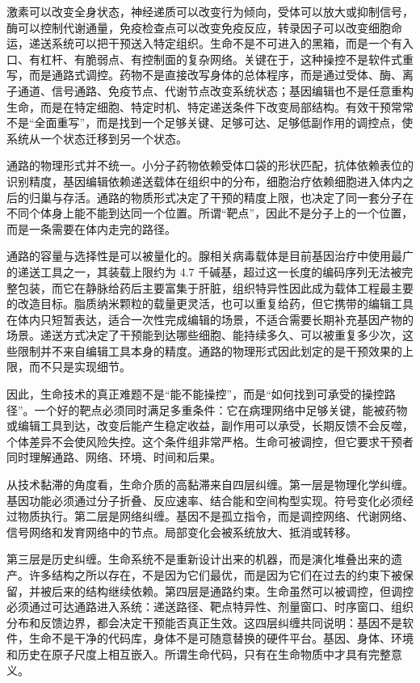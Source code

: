 
激素可以改变全身状态，神经递质可以改变行为倾向，受体可以放大或抑制信号，酶可以控制代谢通量，免疫检查点可以改变免疫反应，转录因子可以改变细胞命运，递送系统可以把干预送入特定组织。生命不是不可进入的黑箱，而是一个有入口、有杠杆、有脆弱点、有控制面的复杂网络。关键在于，这种操控不是软件式重写，而是通路式调控。药物不是直接改写身体的总体程序，而是通过受体、酶、离子通道、信号通路、免疫节点、代谢节点改变系统状态；基因编辑也不是任意重构生命，而是在特定细胞、特定时机、特定递送条件下改变局部结构。有效干预常常不是“全面重写”，而是找到一个足够关键、足够可达、足够低副作用的调控点，使系统从一个状态迁移到另一个状态。

通路的物理形式并不统一。小分子药物依赖受体口袋的形状匹配，抗体依赖表位的识别精度，基因编辑依赖递送载体在组织中的分布，细胞治疗依赖细胞进入体内之后的归巢与存活。通路的物质形式决定了干预的精度上限，也决定了同一套分子在不同个体身上能不能到达同一个位置。所谓“靶点”，因此不是分子上的一个位置，而是一条需要在体内走完的路径。

通路的容量与选择性是可以被量化的。腺相关病毒载体是目前基因治疗中使用最广的递送工具之一，其装载上限约为 4.7 千碱基，超过这一长度的编码序列无法被完整包装，而它在静脉给药后主要富集于肝脏，组织特异性因此成为载体工程最主要的改造目标。脂质纳米颗粒的载量更灵活，也可以重复给药，但它携带的编辑工具在体内只短暂表达，适合一次性完成编辑的场景，不适合需要长期补充基因产物的场景。递送方式决定了干预能到达哪些细胞、能持续多久、可以被重复多少次，这些限制并不来自编辑工具本身的精度\cite{naso2017adeno}。通路的物理形式因此划定的是干预效果的上限，而不只是实现细节。

因此，生命技术的真正难题不是“能不能操控”，而是“如何找到可承受的操控路径”。一个好的靶点必须同时满足多重条件：它在病理网络中足够关键，能被药物或编辑工具到达，改变后能产生稳定收益，副作用可以承受，长期反馈不会反噬，个体差异不会使风险失控。这个条件组非常严格。生命可被调控，但它要求干预者同时理解通路、网络、环境、时间和后果。

从技术黏滞的角度看，生命介质的高黏滞来自四层纠缠。第一层是物理化学纠缠。基因功能必须通过分子折叠、反应速率、结合能和空间构型实现。符号变化必须经过物质执行。第二层是网络纠缠。基因不是孤立指令，而是调控网络、代谢网络、信号网络和发育网络中的节点。局部变化会被系统放大、抵消或转移。

第三层是历史纠缠。生命系统不是重新设计出来的机器，而是演化堆叠出来的遗产。许多结构之所以存在，不是因为它们最优，而是因为它们在过去的约束下被保留，并被后来的结构继续依赖。第四层是通路约束。生命虽然可以被调控，但调控必须通过可达通路进入系统：递送路径、靶点特异性、剂量窗口、时序窗口、组织分布和反馈边界，都会决定干预能否真正生效。这四层纠缠共同说明：基因不是软件，生命不是干净的代码库，身体不是可随意替换的硬件平台。基因、身体、环境和历史在原子尺度上相互嵌入。所谓生命代码，只有在生命物质中才具有完整意义。

